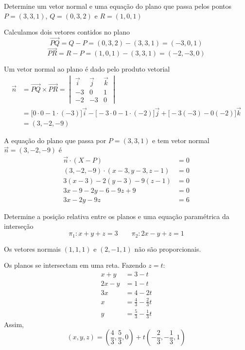 \documentclass[a4paper,12pt,fleqn]{article}
\begin{document}

Determine um vetor normal e uma equação do plano que passa pelos pontos
\(P = (3, 3, 1)\),
\(Q = (0, 3, 2)\) e
\(R = (1, 0, 1)\)

\begin{answer}
  Calculamos dois vetores contidos no plano
  \[
    \overrightarrow{PQ}
    = Q - P
    = (0, 3, 2) - (3, 3, 1)
    =( -3, 0, 1)
  \]
  \[
    \overrightarrow{PR}
    = R - P
    = (1, 0, 1) - (3, 3, 1)
    = (-2, -3, 0)
  \]

  Um vetor normal ao plano é dado pelo produto vetorial
  \begin{align*}
    \vec{n}
    & = \overrightarrow{PQ}\times\overrightarrow{PR}
      = \begin{vmatrix}
      \vec{i} & \vec{j} & \vec{k} \\
      -3      &  0      & 1       \\
      -2      & -3      & 0
    \end{vmatrix}
    \\
    & = \big[  0\cdot 0 - 1\cdot(-3) \big] \vec{i}
      - \big[ -3\cdot 0 - 1\cdot(-2) \big] \vec{j}
      + \big[ -3(-3)    - 0(-2)      \big] \vec{k}
    \\
    & = (3, -2, -9)
  \end{align*}

  A equação do plano que passa por \(P = ( 3, 3, 1)\)
  e tem vetor normal \(\vec{n} = (3, -2, -9)\) é
  \begin{align*}
    \vec{n} \cdot (X-P) & = 0 \\
    (3, -2, -9) \cdot (x-3, y-3, z-1) & = 0 \\
    3(x-3) -2(y-3) -9 (z-1) & = 0 \\
    3x -9 -2y -6 -9z +9 & = 0 \\
    3x -2y -9z & = 6
    \end{align*}
\end{answer}

Determine a posição relativa entre os planos e uma equação paramétrica da interseção
\[
  \pi_1\colon  x + y + z = 3 \qquad
  \pi_2\colon 2x - y + z = 1
\]

\begin{answer}
  Os vetores normais $(1, 1, 1)$ e $(2, -1, 1)$ não são proporcionais.

  Os planos se intersectam em uma reta. Fazendo $z=t$:
  \begin{align*}
    x+y  & =3-t                      \\
    2x-y & =1-t                      \\
    3x   & =4-2t                     \\
    x    & =\frac{4}{3}-\frac{2}{3}t \\
    y    & =\frac{5}{3}-\frac{1}{3}t
  \end{align*}
  Assim,
  \[
    (x, y, z)
    = \left(\frac{4}{3},\frac{5}{3},0\right)+t\left(-\frac{2}{3},-\frac{1}{3},1\right)
  \]
\end{answer}
\end{document}

